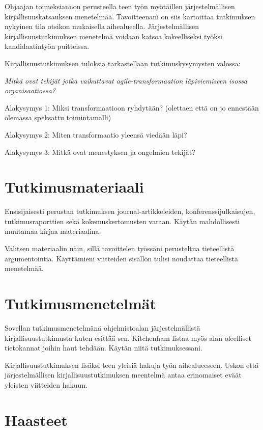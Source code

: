 \documentclass[12pt,a4paper,finnish,oneside]{article}
\begin{document}
Ohjaajan toimeksiannon perusteella teen työn myötäillen järjestelmällisen
kirjallisuuskatsauksen menetelmää. Tavoitteenani on siis kartoittaa tutkimuksen
nykyinen tila otsikon mukaisella aihealueella. Järjestelmällisen
kirjallisuustutkimuksen menetelmä voidaan katsoa kokeelliseksi työksi
kandidaatintyön puitteissa.

Kirjallisuustutkimuksen tuloksia tarkastellaan tutkimuskysymysten valossa:

\textit{Mitkä ovat tekijät jotka vaikuttavat agile-transformaation läpiviemiseen isossa
organisaatiossa?}

Alakysymys 1: Miksi transformaatioon ryhdytään? (olettaen että on jo ennestään olemassa speksattu toimintamalli)

Alakysymys 2: Miten transformaatio yleensä viedään läpi?

Alakysymys 3: Mitkä ovat menestyksen ja ongelmien tekijät?



\section{Tutkimusmateriaali}

Ensisijaisesti perustan tutkimuksen journal-artikkeleiden,
konferenssijulkaisujen, tutkimusraporttien sekä kokemuskertomusten varaan.
Käytän mahdollisesti muutamaa kirjaa materiaalina.

Valitsen materiaalin näin, sillä tavoittelen työssäni perusteltua tieteellistä
argumentointia. Käyttämieni viitteiden sisällön tulisi noudattaa tieteellistä
menetelmää.


\section{Tutkimusmenetelmät}

Sovellan tutkimusmenetelmänä ohjelmistoalan järjestelmällistä
kirjallisuustutkimusta kuten \cite{Kitchenham2007} esittää sen.
Kitchenham listaa myös alan oleelliset tietokannat joihin haut tehdään. Käytän
niitä tutkimuksessani.

Kirjallisuustutkimuksen lisäksi teen yleisiä hakuja työn aihealueeseen. Uskon
että järjestelmällisen kirjallisuustutkimuksen meentelmä antaa erinomaiset
eväät yleisten viitteiden hakuun.

\section{Haasteet}
\end{document}
